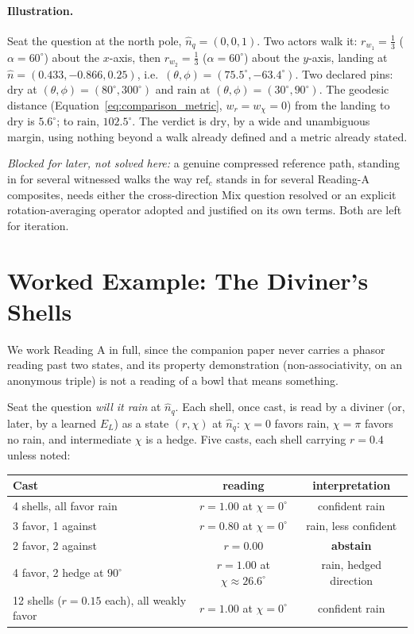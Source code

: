\documentclass[12pt, a4paper]{article}
\begin{document}
\paragraph{Illustration.} Seat the question at the north pole,
$\hat n_q=(0,0,1)$. Two actors walk it: $r_{w_1}=\tfrac13$
($\alpha=60^\circ$) about the $x$-axis, then $r_{w_2}=\tfrac13$
($\alpha=60^\circ$) about the $y$-axis, landing at
$\hat n=(0.433,-0.866,0.25)$, i.e.\ $(\theta,\phi)=(75.5^\circ,
-63.4^\circ)$. Two declared pins: $\mathrm{dry}$ at
$(\theta,\phi)=(80^\circ,300^\circ)$ and $\mathrm{rain}$ at
$(\theta,\phi)=(30^\circ,90^\circ)$. The geodesic distance
(Equation~\eqref{eq:comparison_metric}, $w_r=w_\chi=0$) from the
landing to $\mathrm{dry}$ is $5.6^\circ$; to $\mathrm{rain}$,
$102.5^\circ$. The verdict is $\mathrm{dry}$, by a wide and
unambiguous margin, using nothing beyond a walk already defined and a
metric already stated.

\emph{Blocked for later, not solved here:} a genuine compressed
reference path, standing in for several witnessed walks the way
$\mathrm{ref}_c$ stands in for several Reading-A composites, needs
either the cross-direction Mix question resolved or an explicit
rotation-averaging operator adopted and justified on its own terms.
Both are left for iteration.

\section{Worked Example: The Diviner's Shells}
\label{sec:worked_example}

We work Reading A in full, since the companion paper never carries a
phasor reading past two states, and its property demonstration
(non-associativity, on an anonymous triple) is not a reading of a
bowl that means something.

Seat the question \emph{will it rain} at $\hat n_q$. Each shell, once
cast, is read by a diviner (or, later, by a learned $E_L$) as a state
$(r,\chi)$ at $\hat n_q$: $\chi=0$ favors rain, $\chi=\pi$ favors no
rain, and intermediate $\chi$ is a hedge. Five casts, each shell
carrying $r=0.4$ unless noted:

\begin{center}
\begin{tabular}{lcc}
\hline
Cast & reading & interpretation \\
\hline
4 shells, all favor rain      & $r=1.00$ at $\chi=0^\circ$   & confident rain \\
3 favor, 1 against            & $r=0.80$ at $\chi=0^\circ$   & rain, less confident \\
2 favor, 2 against            & $r=0.00$                     & \textbf{abstain} \\
4 favor, 2 hedge at $90^\circ$ & $r=1.00$ at $\chi\approx 26.6^\circ$ & rain, hedged direction \\
12 shells ($r=0.15$ each), all weakly favor    & $r=1.00$ at $\chi=0^\circ$   & confident rain \\
\hline
\end{tabular}
\end{center}
\end{document}
